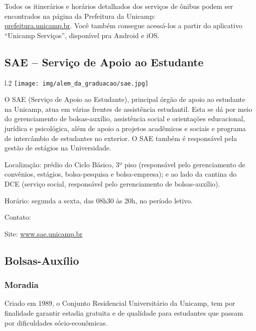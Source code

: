 Todos os itinerários e horários detalhados dos serviços de ônibus podem ser
encontrados na página da Prefeitura da Unicamp: \\\url{prefeitura.unicamp.br}.
Você também consegue acessá-los a partir do aplicativo ``Unicamp Serviços'',
disponível pra Android e iOS.

\subsection{SAE -- Serviço de Apoio ao Estudante}

\begin{wrapfigure}{l}{.2\textwidth}
  \centering
  \texttt{[image: img/alem\_da\_graduacao/sae.jpg]}
\end{wrapfigure}

O SAE (Serviço de Apoio ao Estudante), principal órgão de apoio ao estudante na
Unicamp, atua em várias frentes de assistência estudantil. Esta se dá por meio
do gerenciamento de bolsas-auxílio, assistência social e orientações
educacional, jurídica e psicológica, além de apoio a projetos acadêmicos e
sociais e programa de intercâmbio de estudantes no exterior. O SAE também é
responsável pela gestão de estágios na Universidade.

\begin{compactitemize}
\item Localização: prédio do Ciclo Básico, 3º piso (responsável pelo
  gerenciamento de convênios, estágios, bolsa-pesquisa e bolsa-empresa); e ao
  lado da cantina do DCE (serviço social, responsável pelo gerenciamento de
  bolsas-auxílio).
\item Horário: segunda a sexta, das 08h30 às 20h, no período letivo.
\item Contato: 
\item Site: \url{www.sae.unicamp.br}
\end{compactitemize}

\subsection{Bolsas-Auxílio}
\subsubsection{Moradia}

Criado em 1989, o Conjunto Residencial Universitário da Unicamp, tem por
finalidade garantir estadia gratuita e de qualidade para estudantes que passam
por dificuldades sócio-econômicas.

